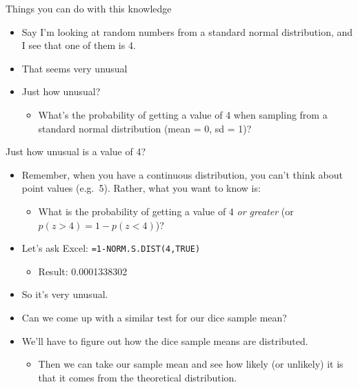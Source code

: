 \begin{frame}{Things you can do with this knowledge}

\begin{itemize}
\itemsep1pt\parskip0pt
\item
  Say I'm looking at random numbers from a standard normal distribution,
  and I see that one of them is 4.
\item
  That seems very unusual
\item
  Just how unusual?

  \begin{itemize}
  \itemsep1pt\parskip0pt
  \item
    What's the probability of getting a value of 4 when sampling from a
    standard normal distribution (mean = 0, sd = 1)?
  \end{itemize}
\end{itemize}

\end{frame}

\begin{frame}{Just how unusual is a value of 4?}

\begin{itemize}
\itemsep1pt\parskip0pt
\item
  Remember, when you have a continuous distribution, you can't think
  about point values (e.g.~5). Rather, what you want to know is:

  \begin{itemize}
  \itemsep1pt\parskip0pt
  \item
    What is the probability of getting a value of 4 \emph{or greater}
    (or \(p(z > 4) = 1-p(z < 4)\))?
  \end{itemize}
\item
  Let's ask Excel: \texttt{=1-NORM.S.DIST(4,TRUE)}

  \begin{itemize}
  \itemsep1pt\parskip0pt
  \item
    Result: 0.0001338302
  \end{itemize}
\item
  So it's very unusual.
\item
  Can we come up with a similar test for our dice sample mean?
\item
  We'll have to figure out how the dice sample means are distributed.

  \begin{itemize}
  \itemsep1pt\parskip0pt
  \item
    Then we can take our sample mean and see how likely (or unlikely) it
    is that it comes from the theoretical distribution.
  \end{itemize}
\end{itemize}

\end{frame}


